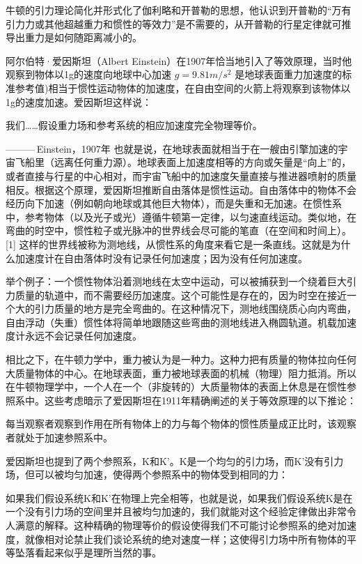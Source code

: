 牛顿的引力理论简化并形式化了伽利略和开普勒的思想，他认识到开普勒的“万有引力力或其他超越重力和惯性的等效力”是不需要的，从开普勒的行星定律就可推导出重力是如何随距离减小的。

阿尔伯特·爱因斯坦（Albert Einstein）在1907年恰当地引入了等效原理，当时他观察到物体以1g的速度向地球中心加速 $g = 9.81 m/s^2$ 是地球表面重力加速度的标准参考值)相当于惯性运动物体的加速度，在自由空间的火箭上将观察到该物体以1g的速度加速。爱因斯坦这样说：

我们……假设重力场和参考系统的相应加速度完全物理等价。

——— Einstein，1907年
也就是说，在地球表面就相当于在一艘由引擎加速的宇宙飞船里（远离任何重力源）。地球表面上加速度相等的方向或矢量是“向上”的，或者直接与行星的中心相对，而宇宙飞船中的加速度矢量直接与推进器喷射的质量相反。根据这个原理，爱因斯坦推断自由落体是惯性运动。自由落体中的物体不会经历向下加速（例如朝向地球或其他巨大物体），而是失重和无加速。在惯性系中，参考物体（以及光子或光）遵循牛顿第一定律，以匀速直线运动。类似地，在弯曲的时空中，惯性粒子或光脉冲的世界线会尽可能的笔直（在空间和时间上）。[1] 这样的世界线被称为测地线，从惯性系的角度来看它是一条直线。这就是为什么加速度计在自由落体时没有记录任何加速度；因为没有任何加速度。

举个例子：一个惯性物体沿着测地线在太空中运动，可以被捕获到一个绕着巨大引力质量的轨道中，而不需要经历加速度。这个可能性是存在的，因为时空在接近一个大的引力质量的地方是完全弯曲的。在这种情况下，测地线围绕质心向内弯曲，自由浮动（失重）惯性体将简单地跟随这些弯曲的测地线进入椭圆轨道。机载加速度计永远不会记录任何加速度。

相比之下，在牛顿力学中，重力被认为是一种力。这种力把有质量的物体拉向任何大质量物体的中心。在地球表面，重力被地球表面的机械（物理）阻力抵消。所以在牛顿物理学中，一个人在一个（非旋转的）大质量物体的表面上休息是在惯性参照系中。这些考虑暗示了爱因斯坦在1911年精确阐述的关于等效原理的以下推论：

每当观察者观察到作用在所有物体上的力与每个物体的惯性质量成正比时，该观察者就处于加速参照系中。

爱因斯坦也提到了两个参照系，K和K’。K是一个均匀的引力场，而K’没有引力场，但可以被均匀加速，使得两个参照系中的物体受到相同的力：

如果我们假设系统K和K’在物理上完全相等，也就是说，如果我们假设系统K是在一个没有引力场的空间里并且被均匀加速的，我们就能对这个经验定律做出非常令人满意的解释。这种精确的物理等价的假设使得我们不可能讨论参照系的绝对加速度，就像相对论禁止我们谈论系统的绝对速度一样；这使得引力场中所有物体的平等坠落看起来似乎是理所当然的事。

